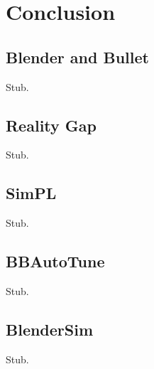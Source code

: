 \chapter{Conclusion}

\label{Chapter6}


\section{Blender and Bullet}

Stub.

\section{Reality Gap}

Stub.

\section{SimPL}

Stub.

\section{BBAutoTune}

Stub.

\section{BlenderSim}

Stub.
